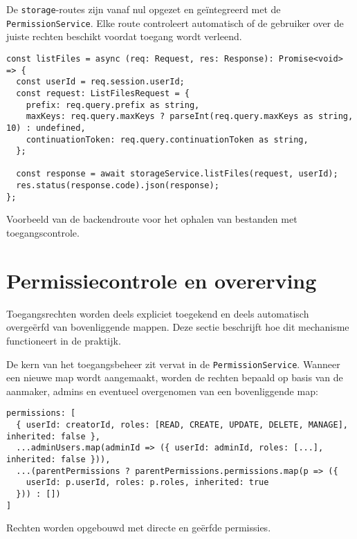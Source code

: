 De \texttt{storage}-routes zijn vanaf nul opgezet en geïntegreerd met de \texttt{PermissionService}. Elke route controleert automatisch of de gebruiker over de juiste rechten beschikt voordat toegang wordt verleend.

\begin{listing}[H]
\begin{verbatim}
const listFiles = async (req: Request, res: Response): Promise<void> => {
  const userId = req.session.userId;
  const request: ListFilesRequest = {
    prefix: req.query.prefix as string,
    maxKeys: req.query.maxKeys ? parseInt(req.query.maxKeys as string, 10) : undefined,
    continuationToken: req.query.continuationToken as string,
  };

  const response = await storageService.listFiles(request, userId);
  res.status(response.code).json(response);
};
\end{verbatim}
\caption[Route voor bestandsoverzicht]{Voorbeeld van de backendroute voor het ophalen van bestanden met toegangscontrole.}
\end{listing}

\section{Permissiecontrole en overerving}
\label{sec:permissiecontrole}

Toegangsrechten worden deels expliciet toegekend en deels automatisch overgeërfd van bovenliggende mappen. Deze sectie beschrijft hoe dit mechanisme functioneert in de praktijk.

De kern van het toegangsbeheer zit vervat in de \texttt{PermissionService}. Wanneer een nieuwe map wordt aangemaakt, worden de rechten bepaald op basis van de aanmaker, admins en eventueel overgenomen van een bovenliggende map:

\begin{listing}[H]
\begin{verbatim}
permissions: [
  { userId: creatorId, roles: [READ, CREATE, UPDATE, DELETE, MANAGE], inherited: false },
  ...adminUsers.map(adminId => ({ userId: adminId, roles: [...], inherited: false })),
  ...(parentPermissions ? parentPermissions.permissions.map(p => ({
    userId: p.userId, roles: p.roles, inherited: true
  })) : [])
]
\end{verbatim}
\caption[Opbouw van permissies bij mapcreatie]{Rechten worden opgebouwd met directe en geërfde permissies.}
\end{listing}

